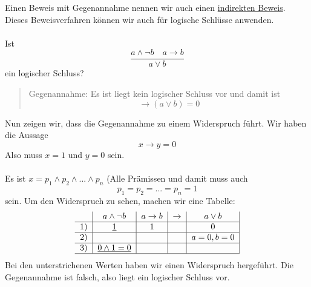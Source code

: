 \documentclass{report}
\begin{document}
Einen Beweis mit Gegenannahme nennen wir auch einen \underline{indirekten Beweis}. Dieses Beweisverfahren können wir auch für logische Schlüsse anwenden.\\\\
Ist
\begin{equation}\frac{a \land \lnot b \quad a \to b}{a \lor b}\end{equation}
ein logischer Schluss?
\begin{quote}Gegenannahme: Es ist liegt kein logischer Schluss vor und damit ist
\begin{equation}[(a \land \lnot b) \land (a \to b)] \to (a \lor b) = 0\end{equation}\end{quote}
Nun zeigen wir, dass die Gegenannahme zu einem Widerspruch führt. Wir haben die Aussage
\begin{equation}x \to y = 0 \nonumber\end{equation}
Also muss $x=1$ und $y=0$ sein.\\\\
Es ist $x = p_1 \land p_2 \land ... \land p_n$ (Alle Prämissen und damit muss auch
\begin{equation}p_1 = p_2 = ... = p_n = 1 \nonumber \end{equation}
sein. Um den Widerspruch zu sehen, machen wir eine Tabelle:
\begin{equation}\begin{tabular}{c | c | c | c | c |}
& $a \land \lnot b$ & $a \to b$ & $\to$ & $a \lor b$ \\ \hline
1) & \underline{1} & 1 & & 0 \\ \hline
2) & & & & $a=0, b=0$ \\ \hline
3) &\underline{$0 \land 1 = 0$} & & & \\ \hline
\end{tabular}\end{equation}Bei den unterstrichenen Werten haben wir einen Widerspruch hergeführt. Die Gegenannahme ist falsch, also liegt ein logischer Schluss vor.
\end{document}
